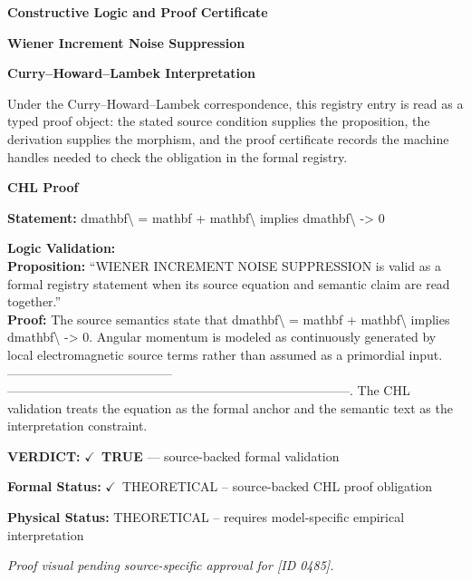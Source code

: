 \clearpage
\begingroup\tzpsupportsetup
\noindent\textbf{\fontsize{10.8pt}{12.8pt}\selectfont [ID 0485] Constructive Logic and Proof Certificate}\par
\noindent\textbf{\fontsize{10pt}{12pt}\selectfont Wiener Increment Noise Suppression}\par
\vspace{0.45em}
\begingroup
\footnotesize
\setlength{\parskip}{0.22em}
\setlength{\parindent}{0pt}
\noindent\textbf{Curry--Howard--Lambek Interpretation}\par
Under the Curry--Howard--Lambek correspondence, this registry entry is read as a typed proof
object: the stated source condition supplies the proposition, the derivation supplies the
morphism, and the proof certificate records the machine handles needed to check the obligation
in the formal registry.

\vspace{0.45em}
\noindent\textbf{CHL Proof}\par
\textbf{Statement:} dmathbf\textbackslash{} = mathbf + mathbf\textbackslash{} implies dmathbf\textbackslash{} -> 0

\textbf{Logic Validation:}\\
\textbf{Proposition:} ``WIENER INCREMENT NOISE SUPPRESSION is valid as a formal registry statement when its
source equation and semantic claim are read together.''\\
\textbf{Proof:} The source semantics state that dmathbf\textbackslash{} = mathbf + mathbf\textbackslash{} implies dmathbf\textbackslash{} -> 0.
Angular momentum is modeled as continuously generated by local electromagnetic source
terms rather than assumed as a primordial input. ---------------------------------------
---------------------------------------------------------------------------------. The
CHL validation treats the equation as the formal anchor and the semantic text as the
interpretation constraint.

\textbf{VERDICT:} \ensuremath{\checkmark}\ \textbf{TRUE} --- source-backed formal validation

\textbf{Formal Status:} \ensuremath{\checkmark}\ THEORETICAL -- source-backed CHL proof obligation

\textbf{Physical Status:} THEORETICAL -- requires model-specific empirical interpretation
\par\vspace{0.45em}
\par
\vfill
\begingroup\footnotesize\itshape
Proof visual pending source-specific approval for [ID 0485].
\par\endgroup
\vfill
\endgroup
\endgroup
